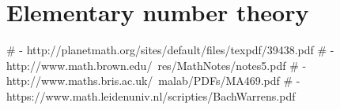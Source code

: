 \chapter{Elementary number theory}



# - http://planetmath.org/sites/default/files/texpdf/39438.pdf
# - http://www.math.brown.edu/~res/MathNotes/notes5.pdf
# - http://www.maths.bris.ac.uk/~malab/PDFs/MA469.pdf
# - https://www.math.leidenuniv.nl/scripties/BachWarrens.pdf


